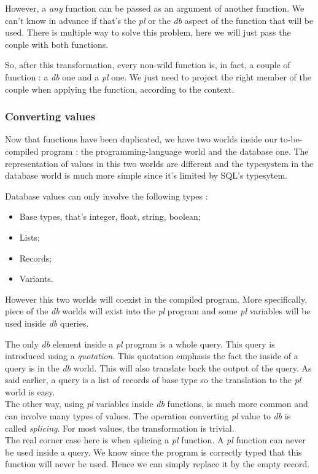 \documentclass[11pt]{article}
\newcommand\mysc[1]{{\rmfamily\textsc{#1}}\xspace}
\newcommand\sql{\mysc{SQL}}
\newcommand\effect[1]{{\em #1}}
\begin{document}
However, a \effect{any} function can be passed as an argument of another function. We can't know in advance if that's the \effect{pl} or the \effect{db} aspect of the function that will be used. There is multiple way to solve this problem, here we will just pass the couple with both functions.

So, after this transformation, every non-wild function is, in fact, a couple of function : a \effect{db} one and a \effect{pl} one. We just need to project the right member of the couple when applying the function, according to the context.

\subsubsection{Converting values}

Now that functions have been duplicated, we have two worlds inside our to-be-compiled program : the programming-language world and the database one. The representation of values in this two worlds are different and the typesystem in the database world is much more simple since it's limited by \sql's typesytem. 

Database values can only involve the following types :
\begin{itemize}
\item Base types, that's integer, float, string, boolean;
\item Lists;
\item Records;
\item Variants.
\end{itemize}

However this two worlds will coexist in the compiled program. More specifically, piece of the \effect{db} worlds will exist into the \effect{pl} program and some \effect{pl} variables will be used inside \effect{db} queries. 

The only \effect{db} element inside a \effect{pl} program is a whole query. This query is introduced using a \emph{quotation}. This quotation emphasis the fact the inside of a query is in the \effect{db} world. This will also translate back the output of the query. As said earlier, a query is a list of records of base type so the translation to the \effect{pl} world is easy.\\

The other way, using \effect{pl} variables inside \effect{db} functions, is much more common and can involve many types of values. 
The operation converting \effect{pl} value to \effect{db} is called \emph{splicing}. For most values, the transformation is trivial.\\
 The real corner case here is when splicing a \effect{pl} function. A \effect{pl} function can never be used inside a query. We know since the program is correctly typed that this function will never be used. Hence we can simply replace it by the empty record.
\end{document}
